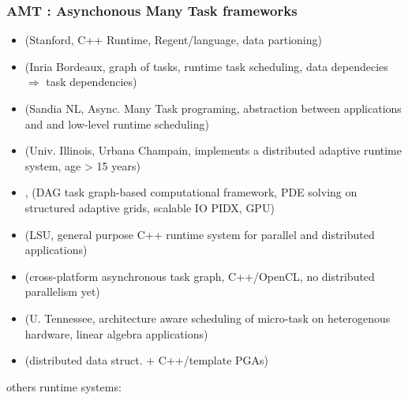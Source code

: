 \begin{frame}
  \frametitle{AMT : Asynchonous Many Task frameworks}
  
  \begin{itemize}
  \item {} (Stanford, C++ Runtime, Regent/language, data partioning)
  \item {} (Inria Bordeaux, graph of tasks, runtime task scheduling, data dependecies $\Rightarrow$ task dependencies)
  \item {} (Sandia NL, Async. Many Task programing, abstraction between applications and and low-level runtime scheduling)
  \item {} (Univ. Illinois, Urbana Champain, implements a distributed adaptive runtime system, age > 15 years)
  \item {}, (DAG task graph-based computational framework, PDE solving on structured adaptive grids, scalable IO PIDX, GPU)
  \item {} (LSU, general purpose C++ runtime system for parallel and distributed applications)
  \item {} (cross-platform asynchronous task graph, C++/OpenCL, no distributed parallelism yet)
  \item {} (U. Tennessee, architecture aware scheduling of micro-task on heterogenous hardware, linear algebra applications)
  \item {} (distributed data struct. + C++/template PGAs)
  \end{itemize}

  {\small
    others runtime systems: \\
  }

  
\end{frame}
